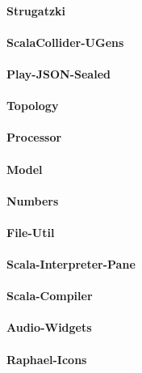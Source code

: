 \documentclass[11pt,a4paper]{article}
\begin{document}
\paragraph{Strugatzki}

\paragraph{ScalaCollider-UGens}

\paragraph{Play-JSON-Sealed}

\paragraph{Topology}

\paragraph{Processor}

\paragraph{Model}

\paragraph{Numbers}

\paragraph{File-Util}

\paragraph{Scala-Interpreter-Pane}

\paragraph{Scala-Compiler}

\paragraph{Audio-Widgets}

\paragraph{Raphael-Icons}
\end{document}

